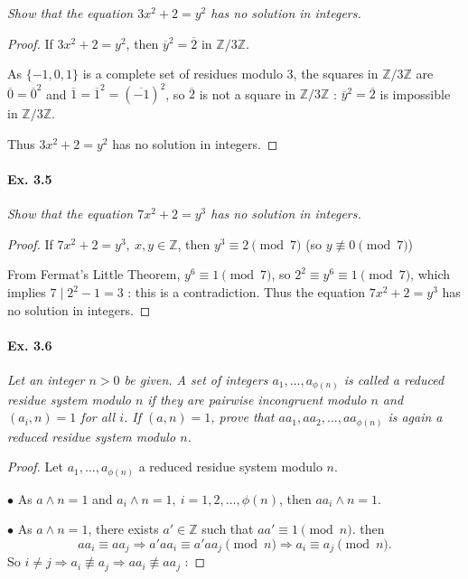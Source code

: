 \documentclass[11pt,a4paper]{article}
\newcommand{\Z}{\mathbb{Z}}
\begin{document}
{{\it Show that the equation $3x^2 + 2 = y^2$ has no solution in integers.
}

\begin{proof}
If $3x^2+2 = y^2$, then  $\overline{y}^2 = \overline{2}$ in $\Z/3\Z$.


As $\{-1,0,1\}$ is a complete set of residues modulo $3$, the squares in $\Z/3\Z$ are $\overline{0} = \overline{0}^2$ and  $\overline{1} = \overline{1}^2 = (\overline{-1})^2$, so $\overline{2}$ is not a square in $\Z/3\Z$ : $\overline{y}^2 = \overline{2}$ is impossible in $\Z/3\Z$.

Thus $3x^2+2 = y^2$ has no solution in integers.
\end{proof}

 \paragraph{Ex. 3.5}

{\it Show that the equation $7x^2 + 2 = y^3$ has no solution in integers.
}

\begin{proof}
If $7x^2 + 2 = y^3,\ x,y \in \Z$, then $y^3 \equiv 2 \pmod 7$ (so $y \not \equiv 0 \pmod 7$)

From Fermat's Little Theorem, $y^6 \equiv 1 \pmod 7$, so $2^2 \equiv y^6 \equiv 1 \pmod 7$, which implies $7 \mid 2^2-1 = 3$ : this is a contradiction. Thus the equation $7x^2 + 2 = y^3$ has no solution in integers.
\end{proof}

\paragraph{Ex. 3.6}

{\it Let an integer $n > 0$ be given. A set of integers $a_1, \ldots, a_{\phi(n)}$ is called a reduced residue system modulo $n$ if they are pairwise incongruent modulo $n$ and $(a_i, n) = 1$ for all $i$. If $(a, n) = 1$, prove that $aa_1 , aa_2, \ldots, aa_{\phi(n)}$ is again a reduced residue system modulo $n$.
}

\begin{proof}
Let  $a_1, \ldots, a_{\phi(n)}$ a reduced residue system modulo $n$.

$\bullet$ As $a\wedge n = 1$ and $a_i \wedge n=1, \ i=1,2,\ldots,\phi(n)$, then $aa_i \wedge n=1$.

$\bullet$ As $a\wedge n = 1$, there exists $a' \in \Z$ such that $aa'\equiv 1 \pmod n$. then
$$a a_i \equiv a a_j \Rightarrow a'aa_i \equiv a'aa_j \pmod n \Rightarrow a_i \equiv a_j \pmod n.$$
So $i\neq j \Rightarrow a_i \not \equiv a_j \Rightarrow a a_i \not \equiv a a_j$ :


\end{proof}}
\end{document}
